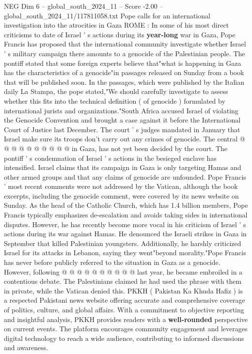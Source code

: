 \begin{textsample}{NEG Dim 6 – global\_south\_2024\_11 – Score -2.00 – global\_south\_2024\_11/117811058.txt}  \label{ex:f6_neg_106}
Pope calls for an international investigation into the atrocities in Gaza ROME : In some of his most direct criticisms to date of Israel ' s actions during its \textbf{year-long} war in Gaza, Pope Francis has proposed that the international community investigate whether Israel ' s military campaign there amounts to a genocide of the Palestinian people.
The pontiff stated that some foreign experts believe that"what is happening in Gaza has the characteristics of a genocide"in passages released on Sunday from a book that will be published soon.
In the passages, which were published by the Italian daily La Stampa, the pope stated,"We should carefully investigate to assess whether this fits into the technical definition ( of genocide ) formulated by international jurists and organizations."South Africa accused Israel of violating the Genocide Convention and brought a case against it before the International Court of Justice last December.
The court ' s judges mandated in January that Israel make sure its troops don't carry out any crimes of genocide.
The central @ @ @ @ @ @ @ @ @ @ in Gaza, has not yet been decided by the court.
The pontiff ' s condemnation of Israel ' s actions in the besieged enclave has intensified.
Israel claims that its campaign in Gaza is only targeting Hamas and other armed groups and that any claims of genocide are unfounded.
Pope Francis ' most recent comments were not addressed by the Vatican, although the book excerpts, including the genocide comment, were covered by its news website on Sunday.
As the head of the Catholic Church, which has 1.4 billion members, Pope Francis typically emphasizes de-escalation and avoids taking sides in international disputes.
However, he has recently become more vocal in his criticism of Israel ' s actions during its war against Hamas.
He denounced the Israeli strikes in Gaza in September that killed Palestinian youngsters.
Additionally, he harshly criticized Israel for its attacks in Lebanon, saying they went"beyond morality."Pope Francis has never before publicly referred to the situation in Gaza as a genocide.
However, following @ @ @ @ @ @ @ @ @ @ last year, he became embroiled in a contentious debate.
The Palestinians claimed he had used the phrase with them in private, while the Vatican denied this.
PKKH ( Pakistan Ka Khuda Hafiz ) is a respected Pakistani news website offering accurate and comprehensive coverage of politics, culture, and global affairs.
With a commitment to objective reporting and insightful analysis, PKKH provides readers with a \textbf{well-rounded} perspective on current events.
The platform encourages community engagement and leverages digital technology to reach a wide audience, contributing to informed discussions and awareness.

\end{textsample}
